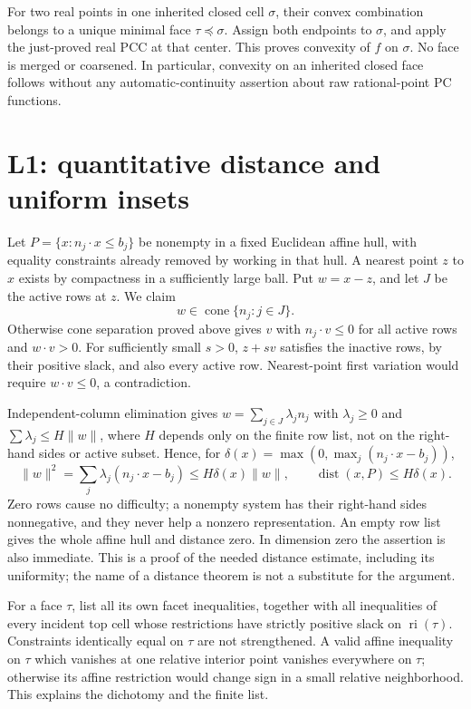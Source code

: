 \documentclass[
  11pt,
]{article}
\begin{document}
For two real points in one inherited closed cell \(\sigma\), their
convex combination belongs to a unique minimal face
\(\tau\preceq\sigma\). Assign both endpoints to \(\sigma\), and apply
the just-proved real PCC at that center. This proves convexity of \(f\)
on \(\sigma\). No face is merged or coarsened. In particular, convexity
on an inherited closed face follows without any automatic-continuity
assertion about raw rational-point PC functions.

\section{L1: quantitative distance and uniform
insets}\label{l1-quantitative-distance-and-uniform-insets}

Let \(P=\{x:n_j\cdot x\leq b_j\}\) be nonempty in a fixed Euclidean
affine hull, with equality constraints already removed by working in
that hull. A nearest point \(z\) to \(x\) exists by compactness in a
sufficiently large ball. Put \(w=x-z\), and let \(J\) be the active rows
at \(z\). We claim \[ w\in\operatorname{cone}\{n_j:j\in J\}. \]
Otherwise cone separation proved above gives \(v\) with
\(n_j\cdot v\leq0\) for all active rows and \(w\cdot v>0\). For
sufficiently small \(s>0\), \(z+s v\) satisfies the inactive rows, by
their positive slack, and also every active row. Nearest-point first
variation would require \(w\cdot v\leq0\), a contradiction.

Independent-column elimination gives \(w=\sum_{j\in J}\lambda_j n_j\)
with \(\lambda_j\geq0\) and \(\sum\lambda_j\leq H\|w\|\), where \(H\)
depends only on the finite row list, not on the right-hand sides or
active subset. Hence, for \(\delta(x)=\max(0,\max_j(n_j\cdot x-b_j))\),
\[
\|w\|^2=\sum_j\lambda_j(n_j\cdot x-b_j)
\leq H\delta(x)\|w\|,
\qquad \operatorname{dist}(x,P)\leq H\delta(x).
\] Zero rows cause no difficulty; a nonempty system has their right-hand
sides nonnegative, and they never help a nonzero representation. An
empty row list gives the whole affine hull and distance zero. In
dimension zero the assertion is also immediate. This is a proof of the
needed distance estimate, including its uniformity; the name of a
distance theorem is not a substitute for the argument.

For a face \(\tau\), list all its own facet inequalities, together with
all inequalities of every incident top cell whose restrictions have
strictly positive slack on \(\operatorname{ri}(\tau)\). Constraints
identically equal on \(\tau\) are not strengthened. A valid affine
inequality on \(\tau\) which vanishes at one relative interior point
vanishes everywhere on \(\tau\); otherwise its affine restriction would
change sign in a small relative neighborhood. This explains the
dichotomy and the finite list.
\end{document}
